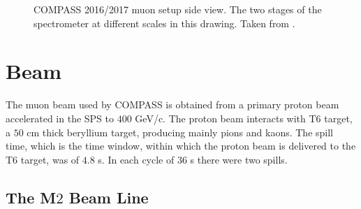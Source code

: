 \begin{figure}
  \centering
	\caption{COMPASS 2016/2017 muon setup side view. The two stages of the spectrometer at different scales in this drawing. Taken from \cite{Setup}.}
	\label{pic:apparatus}
\end{figure}


\section{Beam}\label{sec:beam}

The muon beam used by COMPASS is obtained from a primary proton beam accelerated in the SPS to $400$ GeV/c. The proton beam interacts with T6 target, a $50$ cm thick beryllium target, producing mainly pions and kaons. The spill time, which is the time window, within which the proton beam is delivered to the T6 target, was of $4.8$ s. In each cycle of $36$ s there were two spills.

\subsection{The M$2$ Beam Line}

